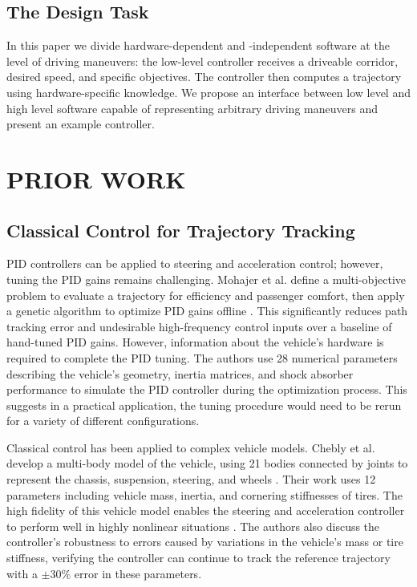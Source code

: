 \documentclass[letterpaper, 10 pt, conference]{ieeeconf}  %
\begin{document}
\subsection{The Design Task}
In this paper we divide hardware-dependent and -independent software at the level of driving maneuvers: the low-level controller receives a driveable corridor, desired speed, and specific objectives. The controller then computes a trajectory using hardware-specific knowledge. We propose an interface between low level and high level software capable of representing arbitrary driving maneuvers and present an example controller.

\section{PRIOR WORK}

\subsection{Classical Control for Trajectory Tracking}
PID controllers can be applied to steering and acceleration control; however, tuning the PID gains remains challenging. Mohajer et al. define a multi-objective problem to evaluate a trajectory for efficiency and passenger comfort, then apply a genetic algorithm to optimize PID gains offline \cite{pid}. This significantly reduces path tracking error and undesirable high-frequency control inputs over a baseline of hand-tuned PID gains. However, information about the vehicle's hardware is required to complete the PID tuning. The authors use 28 numerical parameters describing the vehicle's geometry, inertia matrices, and shock absorber performance to simulate the PID controller during the optimization process. This suggests in a practical application, the tuning procedure would need to be rerun for a variety of different configurations.


Classical control has been applied to complex vehicle models. Chebly et al. develop a multi-body model of the vehicle, using 21 bodies connected by joints to represent the chassis, suspension, steering, and wheels \cite{CHEBLY201712526}. Their work uses 12 parameters including vehicle mass, inertia, and cornering stiffnesses of tires. The high fidelity of this vehicle model enables the steering and acceleration controller to perform well in highly nonlinear situations \cite{CHEBLY201712526}. The authors also discuss the controller's robustness to errors caused by variations in the vehicle's mass or tire stiffness, verifying the controller can continue to track the reference trajectory with a $\pm30\%$ error in these parameters.
\end{document}
